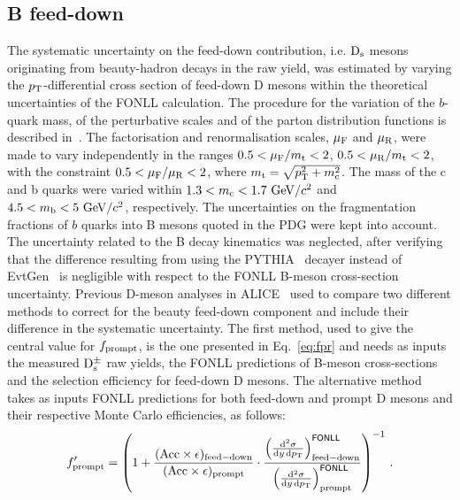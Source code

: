 \subsection{B feed-down}
\label{sec:BfdSub}
The systematic uncertainty on the feed-down contribution, i.e. ${\rm D_s}$ mesons
originating from beauty-hadron decays in the raw yield, was estimated by varying the $p_{\rm T}$-differential 
cross section of feed-down D mesons within the theoretical uncertainties
of the FONLL calculation. The procedure for the variation of the $b$-quark mass, 
of the perturbative scales and of the parton distribution functions is described 
in~\cite{Cacciari:2012ny}. The factorisation and renormalisation 
scales, $\mu_{\rm F}$ and $\mu_{\rm R}$, were made to vary independently 
in the ranges $0.5<\mu_{\rm F}/m_{\rm t}<2$, $0.5<\mu_{\rm R}/m_{\rm t}<2$, 
with the constraint $0.5<\mu_{\rm F}/\mu_{\rm R}<2$, 
where $m_{\rm t}=\sqrt{p_{\rm T}^2+m_{\rm c}^2}$.
The mass of the c and b quarks were varied within $1.3<m_{\rm c}<1.7~\mathrm{GeV}/c^2$ 
and $4.5<m_{\rm b}<5~\mathrm{GeV}/c^2$, respectively.
The uncertainties on the fragmentation fractions of $b$ quarks into B mesons 
quoted in the PDG were kept into account. The uncertainty related to the B decay 
kinematics was neglected, after verifying that the difference resulting 
from using the PYTHIA~\cite{Sjostrand:2006za} decayer instead of 
EvtGen~\cite{Lange:2001uf} is negligible 
with respect to the FONLL B-meson cross-section uncertainty.
Previous D-meson analyses in 
ALICE~\cite{ALICE:2011aa,Adam:2016ich,Adam:2015jda} 
used to compare two different methods to correct for the beauty feed-down component 
and include their difference in the systematic uncertainty. 
The first method, used to give the central value for $f_{\rm prompt}$, 
is the one presented in Eq.~\ref{eq:fpr} and needs as inputs the measured ${\rm D_s^{\pm}}$ raw yields, the FONLL predictions
of B-meson cross-sections and the selection efficiency for feed-down 
D mesons. The alternative method takes as inputs FONLL predictions for both 
feed-down and prompt D mesons and their respective Monte Carlo efficiencies, 
as follows:
\begin{equation}
f^\prime_{\rm prompt} = \left( 	1 + 	\frac{({\rm Acc}\times\epsilon)_{{\rm feed-down}}}{({\rm Acc}\times\epsilon)_{{\rm prompt}}}	\cdot
		 \frac{ \left(\frac{{\rm d}^2 \sigma}{{\rm d}y \, {\rm d} p_{\rm T} } \right)^{{\sf FONLL}}_{{\rm feed-down}} }{ \left(\frac{{\rm d}^2 \sigma}{{\rm d}y \, {\rm d} p_{\rm T} } \right)^{{\sf FONLL}}_{ {\rm prompt} } } 
\right)^{-1} \, .
\label{eq:fc}
\end{equation}
